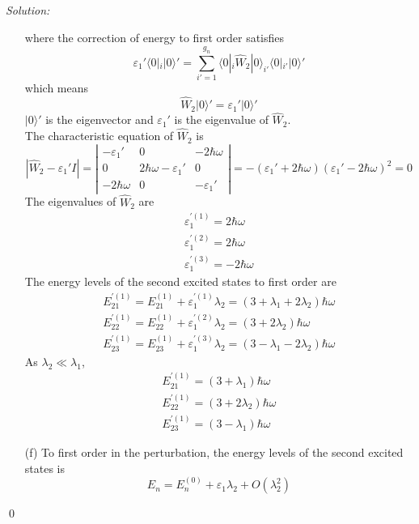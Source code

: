 \documentclass[10pt,a4paper]{article}
\newenvironment{sol}
    {\emph{Solution:}
    }
    {
    \qed
    }
\begin{document}
\begin{sol}
\begin{itemize}
\begin{equation}
\end{equation}
where the correction of energy to first order satisfies
\begin{equation}
\varepsilon_1'\langle0|_i|0\rangle'=\sum_{i'=1}^{g_n}\langle0|_i\hat{W}_2|0\rangle_{i'}\langle0|_{i'}|0\rangle'
\end{equation}
which means
\begin{equation}
\hat{W}_2|0\rangle'=\varepsilon_1'|0\rangle'
\end{equation}
$|0\rangle'$ is the eigenvector and $\varepsilon_1'$ is the eigenvalue of $\hat{W}_2$.\\
The characteristic equation of $\hat{W}_2$ is
\begin{equation}
|\hat{W}_2-\varepsilon_1'I|=\left|\begin{array}{ccc}
-\varepsilon_1'&0&-2\hbar\omega\\
0&2\hbar\omega-\varepsilon_1'&0\\
-2\hbar\omega&0&-\varepsilon_1'
\end{array}\right|=-(\varepsilon_1'+2\hbar\omega)(\varepsilon_1'-2\hbar\omega)^2=0
\end{equation}
The eigenvalues of $\hat{W}_2$ are
\begin{gather}
\varepsilon_{1}^{'(1)}=2\hbar\omega\\
\varepsilon_1^{'(2)}=2\hbar\omega\\
\varepsilon_1^{'(3)}=-2\hbar\omega
\end{gather}
The energy levels of the second excited states to first order are
\begin{gather}
E_{21}^{'(1)}=E_{21}^{(1)}+\varepsilon_1^{'(1)}\lambda_2=(3+\lambda_1+2\lambda_2)\hbar\omega\\
E_{22}^{'(1)}=E_{22}^{(1)}+\varepsilon_1^{'(2)}\lambda_2=(3+2\lambda_2)\hbar\omega\\
E_{23}^{'(1)}=E_{23}^{(1)}+\varepsilon_1^{'(3)}\lambda_2=(3-\lambda_1-2\lambda_2)\hbar\omega
\end{gather}
As $\lambda_2\ll\lambda_1$,
\begin{gather}
E_{21}^{'(1)}=(3+\lambda_1)\hbar\omega\\
E_{22}^{'(1)}=(3+2\lambda_2)\hbar\omega\\
E_{23}^{'(1)}=(3-\lambda_1)\hbar\omega
\end{gather}
\item[(f)] To first order in the perturbation, the energy levels of the second excited states is
\begin{equation}
E_n=E_n^{(0)}+\varepsilon_1\lambda_2+O(\lambda_2^2)

\end{equation}
\end{itemize}
\end{sol}
\end{document}
